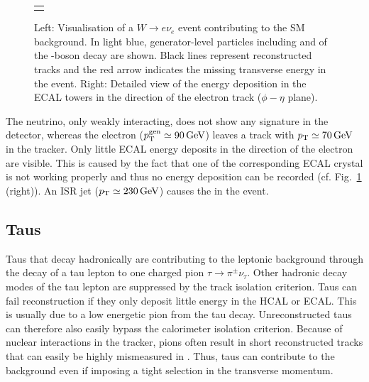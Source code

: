 \begin{figure}[!t]
\begin{tabular}{c}
\begin{minipage}[c]{0.49\textwidth}
  \end{minipage} 
  \end{tabular}
 \caption{Left: Visualisation of a $W\rightarrow e\nu_e$ event contributing to the SM background. 
          In light blue, generator-level particles including \lel and \nue of the \W-boson decay are shown. 
          Black lines represent reconstructed tracks and the red arrow indicates the missing transverse energy in the event.
          Right: Detailed view of the energy deposition in the ECAL towers in the direction of the electron track ($\phi - \eta$ plane).}
  \label{fig:LostElectron}
\end{figure}
The neutrino, only weakly interacting, does not show any signature in the detector, whereas the electron ($p^{\text{gen}}_{\text{T}}\simeq 90\,\text{Ge}\kern-0.06667em\text{V}$) leaves a track with $p_{\text{T}}\simeq 70\,\text{Ge}\kern-0.06667em\text{V}$ in the tracker. 
Only little ECAL energy deposits in the direction of the electron are visible. 
This is caused by the fact that one of the corresponding ECAL crystal is not working properly and thus no energy deposition can be recorded (cf. Fig.~\ref{fig:LostElectron} (right)).
An ISR jet ($p_{\text{T}}\simeq 230\,\text{Ge}\kern-0.06667em\text{V}$) causes the \met in the event. 
 

\subsection*{Taus}
Taus that decay hadronically are contributing to the leptonic background through the decay of a tau lepton to one charged pion $\tau\rightarrow\pi^{\pm}\nu_{\tau}$.
Other hadronic decay modes of the tau lepton are suppressed by the track isolation criterion.
Taus can fail reconstruction if they only deposit little energy in the HCAL or ECAL.
This is usually due to a low energetic pion from the tau decay.
Unreconstructed taus can therefore also easily bypass the calorimeter isolation criterion.
Because of nuclear interactions in the tracker, pions often result in short reconstructed tracks that can easily be highly mismeasured in \pt.
Thus, taus can contribute to the background even if imposing a tight selection in the transverse momentum.


